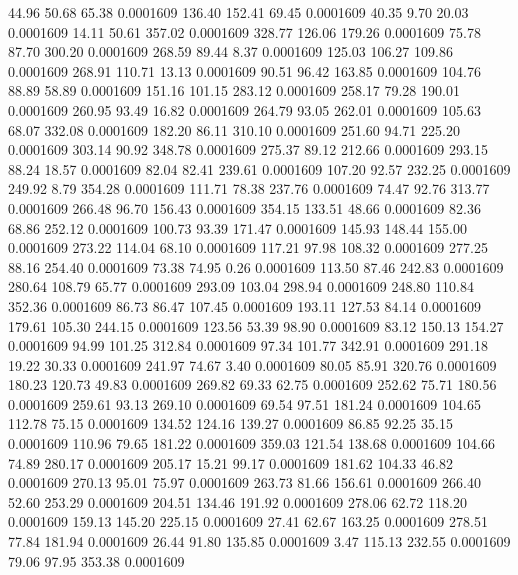   44.96   50.68   65.38   0.0001609
 136.40  152.41   69.45   0.0001609
  40.35    9.70   20.03   0.0001609
  14.11   50.61  357.02   0.0001609
 328.77  126.06  179.26   0.0001609
  75.78   87.70  300.20   0.0001609
 268.59   89.44    8.37   0.0001609
 125.03  106.27  109.86   0.0001609
 268.91  110.71   13.13   0.0001609
  90.51   96.42  163.85   0.0001609
 104.76   88.89   58.89   0.0001609
 151.16  101.15  283.12   0.0001609
 258.17   79.28  190.01   0.0001609
 260.95   93.49   16.82   0.0001609
 264.79   93.05  262.01   0.0001609
 105.63   68.07  332.08   0.0001609
 182.20   86.11  310.10   0.0001609
 251.60   94.71  225.20   0.0001609
 303.14   90.92  348.78   0.0001609
 275.37   89.12  212.66   0.0001609
 293.15   88.24   18.57   0.0001609
  82.04   82.41  239.61   0.0001609
 107.20   92.57  232.25   0.0001609
 249.92    8.79  354.28   0.0001609
 111.71   78.38  237.76   0.0001609
  74.47   92.76  313.77   0.0001609
 266.48   96.70  156.43   0.0001609
 354.15  133.51   48.66   0.0001609
  82.36   68.86  252.12   0.0001609
 100.73   93.39  171.47   0.0001609
 145.93  148.44  155.00   0.0001609
 273.22  114.04   68.10   0.0001609
 117.21   97.98  108.32   0.0001609
 277.25   88.16  254.40   0.0001609
  73.38   74.95    0.26   0.0001609
 113.50   87.46  242.83   0.0001609
 280.64  108.79   65.77   0.0001609
 293.09  103.04  298.94   0.0001609
 248.80  110.84  352.36   0.0001609
  86.73   86.47  107.45   0.0001609
 193.11  127.53   84.14   0.0001609
 179.61  105.30  244.15   0.0001609
 123.56   53.39   98.90   0.0001609
  83.12  150.13  154.27   0.0001609
  94.99  101.25  312.84   0.0001609
  97.34  101.77  342.91   0.0001609
 291.18   19.22   30.33   0.0001609
 241.97   74.67    3.40   0.0001609
  80.05   85.91  320.76   0.0001609
 180.23  120.73   49.83   0.0001609
 269.82   69.33   62.75   0.0001609
 252.62   75.71  180.56   0.0001609
 259.61   93.13  269.10   0.0001609
  69.54   97.51  181.24   0.0001609
 104.65  112.78   75.15   0.0001609
 134.52  124.16  139.27   0.0001609
  86.85   92.25   35.15   0.0001609
 110.96   79.65  181.22   0.0001609
 359.03  121.54  138.68   0.0001609
 104.66   74.89  280.17   0.0001609
 205.17   15.21   99.17   0.0001609
 181.62  104.33   46.82   0.0001609
 270.13   95.01   75.97   0.0001609
 263.73   81.66  156.61   0.0001609
 266.40   52.60  253.29   0.0001609
 204.51  134.46  191.92   0.0001609
 278.06   62.72  118.20   0.0001609
 159.13  145.20  225.15   0.0001609
  27.41   62.67  163.25   0.0001609
 278.51   77.84  181.94   0.0001609
  26.44   91.80  135.85   0.0001609
   3.47  115.13  232.55   0.0001609
  79.06   97.95  353.38   0.0001609
